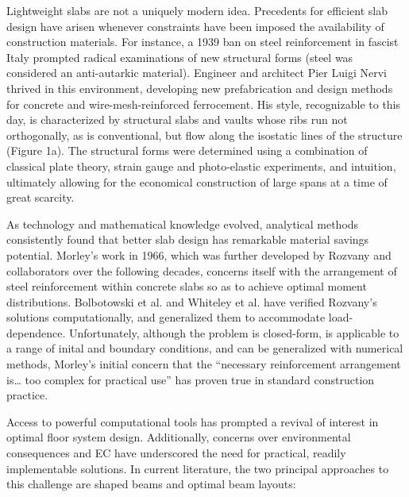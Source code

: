 \documentclass[10pt, letterpaper]{article} %
\begin{document}
    Lightweight slabs are not a uniquely modern idea. Precedents for efficient slab design have arisen whenever constraints have been imposed the availability of construction materials. For instance, a 1939 ban on steel reinforcement in fascist Italy prompted radical examinations of new structural forms (steel was considered an anti-autarkic material).\cite{ioriPierLuigiNervis1960} Engineer and architect Pier Luigi Nervi thrived in this environment, developing new prefabrication and design methods for concrete and wire-mesh-reinforced ferrocement. His style, recognizable to this day, is characterized by structural slabs and vaults whose ribs run not orthogonally, as is conventional, but flow along the isostatic lines of the structure (Figure 1a). The structural forms were determined using a combination of classical plate theory, strain gauge and photo-elastic experiments, and intuition, ultimately allowing for the economical construction of large spans at a time of great scarcity.\cite{halpernRibbedFloorSlab2013}

    As technology and mathematical knowledge evolved, analytical methods consistently found that better slab design has remarkable material savings potential. Morley’s work in 1966,\cite{morleyMinimumReinforcementConcrete1966} which was further developed by Rozvany and collaborators over the following decades,\cite{rozvanyOptimalDesignFlexural1976} concerns itself with the arrangement of steel reinforcement within concrete slabs so as to achieve optimal moment distributions. Bolbotowski et al. and Whiteley et al. have verified Rozvany’s solutions computationally, and generalized them to accommodate load-dependence.\cite{bolbotowskiDesignOptimumGrillages2018,whiteleyEngineeringDesignOptimized2023} Unfortunately, although the problem is closed-form, is applicable to a range of inital and boundary conditions, and can be generalized with numerical methods, Morley’s initial concern that the “necessary reinforcement arrangement is… too complex for practical use”\cite{morleyMinimumReinforcementConcrete1966} has proven true in standard construction practice.

    Access to powerful computational tools has prompted a revival of interest in optimal floor system design. Additionally, concerns over environmental consequences and EC have underscored the need for practical, readily implementable solutions. In current literature, the two principal approaches to this challenge are shaped beams and optimal beam layouts:
\end{document}
